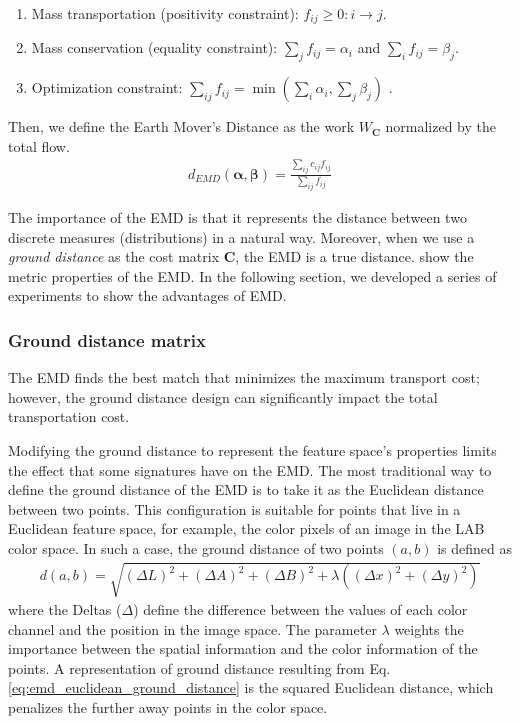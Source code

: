 \begin{enumerate}%
 \item Mass transportation (positivity constraint): $f_{ij} \geq 0 : i\rightarrow j$.
 \item Mass conservation (equality constraint):  $\sum_{j}f_{ij}=\alpha_i$ and $\sum_{i}f_{ij}= \beta_j$.
 \item Optimization constraint: $\sum_{ij}f_{ij} = \min \left( \sum_{i}\alpha_i, \sum_{j}\beta_j \right)$ .
\end{enumerate}  

Then, we define the Earth Mover's Distance as the work $W_{\mathbf{C}}$ normalized by the total flow.
\begin{eqnarray}
d_{EMD}(\boldsymbol{\alpha}, \boldsymbol{\beta}) = \frac{\sum_{ij}c_{ij}f_{ij}}{\sum_{ij}f_{ij}}
\label{eq:emd}
\end{eqnarray}

The importance of the EMD is that it represents the distance between two discrete measures (distributions) in a natural way. Moreover, when we use a \textit{ground distance} as the cost matrix $\mathbf{C}$, the EMD is a true distance. \cite{Peyre.Cuturi:arXiv:2018} show the metric properties of the EMD. In the following section, we developed a series of experiments to show the advantages of EMD. 

\subsubsection{Ground distance matrix}
The EMD finds the best match that minimizes the maximum transport cost; however, the ground distance design can significantly impact the total transportation cost.

Modifying the ground distance to represent the feature space's properties limits the effect that some signatures have on the EMD. The most traditional way to define the ground distance of the EMD is to take it as the Euclidean distance between two points. This configuration is suitable for points that live in a Euclidean feature space, for example, the color pixels of an image in the LAB color space. In such a case, the ground distance of two points $(a,b)$ is defined as
\begin{eqnarray} \label{eq:emd_euclidean_ground_distance}
	d(a, b) = \sqrt{(\Delta L)^2 + (\Delta A)^2 + (\Delta B)^2 + \lambda((\Delta x)^2 +(\Delta y)^2) } 	
\end{eqnarray}
where the Deltas ($\Delta$) define the difference between the values of each color channel and the position in the image space. The parameter $\lambda$ weights the importance between the spatial information and the color information of the points. A representation of ground distance resulting from Eq. \eqref{eq:emd_euclidean_ground_distance} is the squared Euclidean distance, which penalizes the further away points in the color space.

